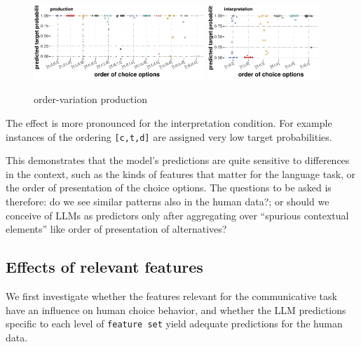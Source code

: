 \documentclass{article}
\begin{document}
\begin{figure}
  \centering

  \includegraphics[width = 0.575\textwidth]{00-pics/order-variation-production.pdf}
  \hfill
  \includegraphics[width = 0.375\textwidth]{00-pics/order-variation-interpretation.pdf}

  \caption{order-variation production}
  \label{fig:order-variation-production}
\end{figure}

The effect is more pronounced for the interpretation condition. For example instances of the ordering \texttt{[c,t,d]} are assigned very low target probabilities.



This demonstrates that the model's predictions are quite sensitive to differences in the context, such as the kinds of features that matter for the language task, or the order of presentation of the choice options.
The questions to be asked is therefore: do we see similar patterns also in the human data?; or should we conceive of LLMs as predictors only after aggregating over ``spurious contextual elements'' like order of presentation of alternatives?

\subsection{Effects of relevant features}

We first investigate whether the features relevant for the communicative
task have an influence on human choice behavior, and whether the LLM
predictions specific to each level of \texttt{feature\ set} yield
adequate predictions for the human data.
\end{document}
